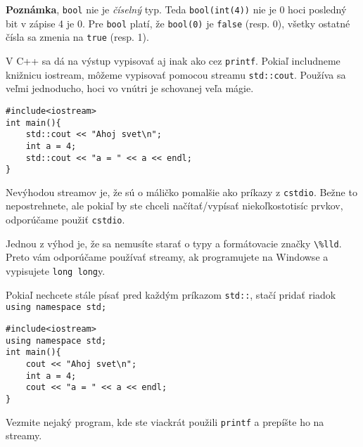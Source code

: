 \textbf{Poznámka}, \verb!bool! nie je \textit{číselný} typ. Teda \verb!bool(int(4))! nie
je 0 hoci posledný bit v zápise 4 je 0.  Pre \verb!bool! platí, že
\verb!bool(0)! je \verb!false! (resp. 0), všetky ostatné čísla sa zmenia na
\verb!true! (resp. 1).



V C++ sa dá na výstup vypisovať aj inak ako cez \verb!printf!. Pokiaľ
includneme knižnicu iostream, môžeme vypisovať pomocou streamu
\verb!std::cout!. Používa sa veľmi jednoducho, hoci vo vnútri je schovanej veľa
mágie.

\begin{lstlisting}
#include<iostream>
int main(){
    std::cout << "Ahoj svet\n";
    int a = 4;
    std::cout << "a = " << a << endl;
}
\end{lstlisting}

Nevýhodou streamov je, že sú o máličko pomalšie ako príkazy z \verb!cstdio!. Bežne
to nepostrehnete, ale pokiaľ by ste chceli načítať/vypísať niekoľkostotisíc
prvkov, odporúčame použiť \verb!cstdio!.

Jednou z výhod je, že sa nemusíte starať o typy a formátovacie značky
\verb"\%lld". Preto vám odporúčame používať streamy, ak programujete na Windowse
a vypisujete \verb!long long!y.

Pokiaľ nechcete stále písať pred každým príkazom \verb!std::!, stačí pridať
riadok \verb!using namespace std;!

\begin{lstlisting}
#include<iostream>
using namespace std;
int main(){
    cout << "Ahoj svet\n";
    int a = 4;
    cout << "a = " << a << endl;
}
\end{lstlisting}

\cvicenie Vezmite nejaký program, kde ste viackrát použili \verb!printf! a
prepíšte ho na streamy.
\fakeriesenie




